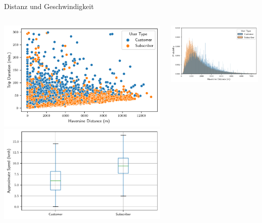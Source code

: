 \begin{frame}{Distanz und Geschwindigkeit}
\begin{columns}
\begin{column}{0.5\linewidth }
\centering
\includegraphics[height=0.45\textheight]{../Images/TimeVsDistance}
\includegraphics[height=0.45\textheight]{../Images/SpeedComparison}
\end{column}
\begin{column}{0.5\linewidth }
\centering
\includegraphics[height=0.45\textheight]{../Images/DistanceComparison}

\end{column}
\end{columns}
\end{frame}
